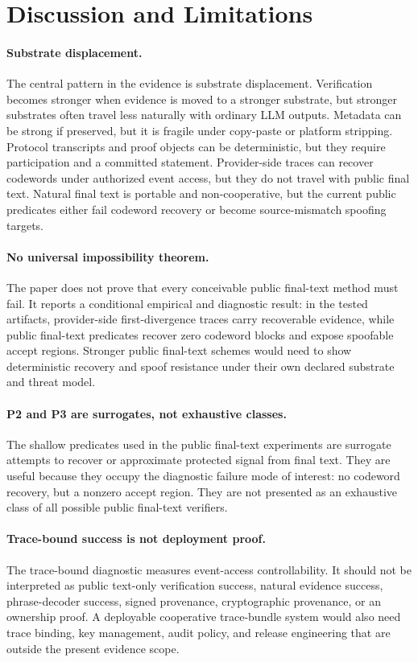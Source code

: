 \section{Discussion and Limitations}
\label{sec:limitations}

\paragraph{Substrate displacement.}
The central pattern in the evidence is substrate displacement.  Verification
becomes stronger when evidence is moved to a stronger substrate, but stronger
substrates often travel less naturally with ordinary LLM outputs.  Metadata can
be strong if preserved, but it is fragile under copy-paste or platform
stripping.  Protocol transcripts and proof objects can be deterministic, but
they require participation and a committed statement.  Provider-side traces can
recover codewords under authorized event access, but they do not travel with
public final text.  Natural final text is portable and non-cooperative, but the
current public predicates either fail codeword recovery or become
source-mismatch spoofing targets.

\paragraph{No universal impossibility theorem.}
The paper does not prove that every conceivable public final-text method must
fail.  It reports a conditional empirical and diagnostic result: in the tested
artifacts, provider-side first-divergence traces carry recoverable evidence,
while public final-text predicates recover zero codeword blocks and expose
spoofable accept regions.  Stronger public final-text schemes would need to
show deterministic recovery and spoof resistance under their own declared
substrate and threat model.

\paragraph{P2 and P3 are surrogates, not exhaustive classes.}
The shallow predicates used in the public final-text experiments are surrogate
attempts to recover or approximate protected signal from final text.  They are
useful because they occupy the diagnostic failure mode of interest: no
codeword recovery, but a nonzero accept region.  They are not presented as an
exhaustive class of all possible public final-text verifiers.

\paragraph{Trace-bound success is not deployment proof.}
The trace-bound diagnostic measures event-access controllability.  It should
not be interpreted as public text-only verification success, natural evidence
success, phrase-decoder success, signed provenance, cryptographic provenance,
or an ownership proof.  A deployable cooperative trace-bundle system would also
need trace binding, key management, audit policy, and release engineering that
are outside the present evidence scope.

